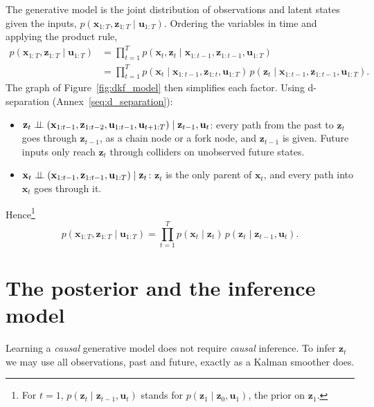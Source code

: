 The generative model is the joint distribution of observations and
latent states given the inputs,
$p(\mathbf{x}_{1:T}, \mathbf{z}_{1:T} \mid \mathbf{u}_{1:T})$. Ordering
the variables in time and applying the product rule,
\begin{align*}
    p(\mathbf{x}_{1:T}, \mathbf{z}_{1:T} \mid \mathbf{u}_{1:T})
    &= \prod_{t=1}^T p(\mathbf{x}_t, \mathbf{z}_t \mid \mathbf{x}_{1:t-1},
       \mathbf{z}_{1:t-1}, \mathbf{u}_{1:T}) \\
    &= \prod_{t=1}^T p(\mathbf{x}_t \mid \mathbf{x}_{1:t-1},
       \mathbf{z}_{1:t}, \mathbf{u}_{1:T})\,
       p(\mathbf{z}_t \mid \mathbf{x}_{1:t-1}, \mathbf{z}_{1:t-1},
       \mathbf{u}_{1:T}).
\end{align*}
The graph of Figure~\ref{fig:dkf_model} then simplifies each factor.
Using d-separation (Annex~\ref{seq:d_separation}):
\begin{itemize}
    \item $\mathbf{z}_{t} \perp\!\!\!\perp (\mathbf{x}_{1:t-1},
    \mathbf{z}_{1:t-2}, \mathbf{u}_{1:t-1}, \mathbf{u}_{t+1:T}) \mid
    \mathbf{z}_{t-1}, \mathbf{u}_t$: every path from the past to
    $\mathbf{z}_t$ goes through $\mathbf{z}_{t-1}$, as a chain node or a
    fork node, and $\mathbf{z}_{t-1}$ is given. Future inputs only reach
    $\mathbf{z}_t$ through colliders on unobserved future states.
    \item $\mathbf{x}_{t} \perp\!\!\!\perp (\mathbf{x}_{1:t-1}, \mathbf{z}_{1:t-1},
    \mathbf{u}_{1:T}) \mid \mathbf{z}_{t}$: $\mathbf{z}_t$ is the only
    parent of $\mathbf{x}_t$, and every path into $\mathbf{x}_t$ goes
    through it.
\end{itemize}
Hence\footnote{For $t=1$, $p(\mathbf{z}_t \mid \mathbf{z}_{t-1},
\mathbf{u}_{t})$ stands for $p(\mathbf{z}_1 \mid \mathbf{z}_0,
\mathbf{u}_{1})$, the prior on $\mathbf{z}_1$.}
\begin{equation}
    p(\mathbf{x}_{1:T}, \mathbf{z}_{1:T} \mid \mathbf{u}_{1:T}) =
    \prod_{t=1}^T p(\mathbf{x}_t \mid \mathbf{z}_{t})\,
    p(\mathbf{z}_t \mid \mathbf{z}_{t-1}, \mathbf{u}_{t}).
    \label{eq:generative_model}
\end{equation}

\section{The posterior and the inference model}\label{sec:posterior}

Learning a \emph{causal} generative model does not require \emph{causal}
inference. To infer $\mathbf{z}_t$ we may use all observations, past and
future, exactly as a Kalman smoother does.

